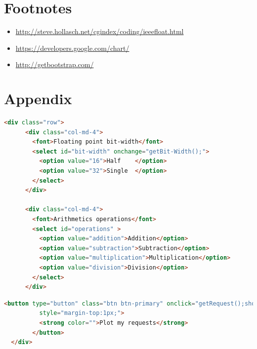 \documentclass[11pt]{article}
\begin{document}
\section*{Footnotes}
\begin{itemize}
\item \url{http://steve.hollasch.net/cgindex/coding/ieeefloat.html}
\item \url{https://developers.google.com/chart/}
\item \url{http://getbootstrap.com/}
\end{itemize}

\newpage
\section{Appendix} \label{app:A} %
\begin{lstlisting}[label={lst:Select option}, language=HTML, caption={Select option for bit-width and arithmetic operations},]
  <div class="row">
      <div class="col-md-4">
        <font>Floating point bit-width</font>
        <select id="bit-width" onchange="getBit-Width();">      
          <option value="16">Half    </option>
          <option value="32">Single  </option>
        </select>
      </div>

      <div class="col-md-4">
        <font>Arithmetics operations</font>
        <select id="operations" > 
          <option value="addition">Addition</option>
          <option value="subtraction">Subtraction</option>
          <option value="multiplication">Multiplication</option>
          <option value="division">Division</option>
        </select>
      </div>
\end{lstlisting}


\begin{lstlisting}[label={lst:Plot my requests}, language=HTML, caption={Plot my requests button to get the value of the select option},]
        <button type="button" class="btn btn-primary" onclick="getRequest();showService();" 
          style="margin-top:1px;">
          <strong color="">Plot my requests</strong>
        </button>
  </div>      
\end{lstlisting}
\end{document}

